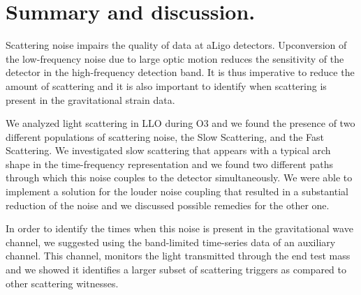 \documentclass[12pt]{iopart}
\begin{document}
\newpage
\section{Summary and discussion.}\label{summary}
 Scattering noise impairs the quality of data at  aLigo detectors. Upconversion of the low-frequency noise due to large optic motion reduces the sensitivity of the detector in the high-frequency detection band. It is thus imperative to reduce the amount of scattering and it is also important to identify when scattering is present in the gravitational strain data. 

We analyzed light scattering in LLO during O3 and we found the presence of two different populations of scattering noise, the Slow Scattering, and the Fast Scattering. We investigated slow scattering that appears with a typical arch shape in the time-frequency representation and we found two different paths through which this noise couples to the detector simultaneously. We were able to implement a solution for the louder noise coupling that resulted in a substantial reduction of the noise and we discussed possible remedies for the other one. 

In order to identify the times when this noise is present in the gravitational wave channel, we suggested using the band-limited time-series data of an auxiliary channel. This channel, monitors the light transmitted through the end test mass and we showed it identifies a larger subset of scattering triggers as compared to other scattering witnesses.


  




%
%

\end{document}
